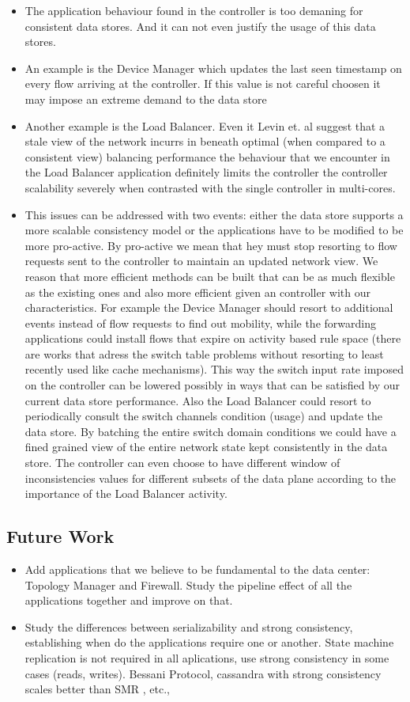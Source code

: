 \begin{itemize}
\item The application behaviour found in the controller is too demaning for consistent data stores. And it can not even justify the usage of this data stores. 
\item An example is the Device Manager which updates the last seen timestamp on every flow arriving at the controller. If this value is not careful choosen it may impose an extreme demand to the data store
\item Another example is the Load Balancer. Even it Levin et. al suggest that a stale view of the network incurrs in beneath optimal (when compared to a consistent view) balancing performance the behaviour that we encounter in the Load Balancer application definitely limits the controller the controller scalability severely when contrasted with the single controller in multi-cores. 
\item This issues can be addressed with two events: either the data store supports a more scalable consistency model or the applications have to be modified to be more pro-active. By pro-active we mean that hey must stop resorting to flow requests sent to the controller to maintain an updated network view. We reason that more efficient methods can be built that can be as much flexible as the existing ones and also more efficient given an controller with our characteristics. For example the Device Manager should resort to additional  events instead of flow requests to find out mobility, while the forwarding applications could install flows that expire on activity based rule space (there are works that adress the switch table problems without resorting to least recently used like cache mechanisms). This way the switch input rate imposed on the controller can be lowered possibly in ways that can be satisfied by our current data store performance. Also the Load Balancer could resort to periodically consult the switch channels condition (usage) and update the data store. By batching the entire switch domain conditions we could have a fined grained  view of the entire network state kept consistently in the data store. The controller can even choose to have different window of inconsistencies values for different subsets of the data plane according to the importance of the Load Balancer activity. 
\end{itemize}
\subsection{Future Work}
\begin{itemize}
\item Add applications that we believe to be fundamental to the data center: Topology Manager and Firewall.  Study the pipeline effect of all the applications together and improve on that. 
\item Study the differences between serializability and strong consistency, establishing when do the applications require one or another. State machine replication is not required in all aplications, use strong consistency in some cases (reads, writes). Bessani Protocol, cassandra with strong consistency scales better than SMR , etc., 
\end{itemize}


